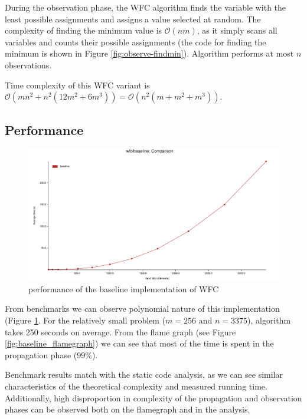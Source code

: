 \documentclass[shortabstract, english, inz]{iithesis}
\begin{document}
During the observation phase, the WFC algorithm finds the variable with the least possible assignments and assigns a value selected at random. The complexity of finding the minimum value is \(\mathcal{O}(nm)\), as it simply scans all variables and counts their possible assignments (the code for finding the minimum is shown in Figure \ref{fig:observe-findmin}). Algorithm performs at most \(n\) observations.

Time complexity of this WFC variant is \(\mathcal{O}(mn^2 + n^2(12m^2 + 6m^3)) = \mathcal{O}(n^2(m + m^2 + m^3))\).


\subsection{Performance}
\begin{figure}[H]
\centering
\includegraphics[width=1\textwidth, angle=0]{images/baseline_performance.png}
\caption{performance of the baseline implementation of WFC}
\label{fig:baseline_performance}
\end{figure}

From benchmarks we can observe polynomial nature of this implementation (Figure \ref{fig:baseline_performance}. For the relatively small problem (\(m=256\) and \(n=3375\)), algorithm takes 250 seconds on average. From the flame graph (see Figure \ref{fig:baseline_flamegraph}) we can see that most of the time is spent in the propagation phase (\(99\%\)).

Benchmark results match with the static code analysis, as we can see similar characteristics of the theoretical complexity and measured running time. Additionally, high disproportion in complexity of the propagation and observation phases can be observed both on the flamegraph and in the analysis.
\end{document}
